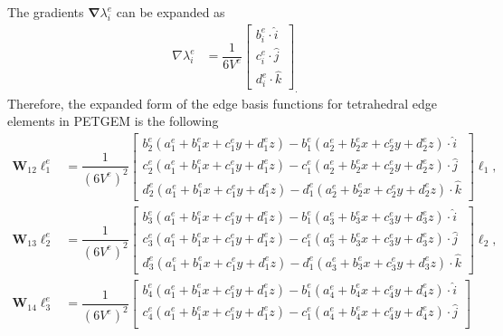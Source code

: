 \documentclass[review]{elsarticle}
\begin{document}
The gradients $\mathbf{\nabla} \lambda^{e}_{i}$ can be expanded as
\begin{align}
\nabla \lambda^{e}_{i} &= \dfrac{1}{6V^{e}} \begin{bmatrix}
b^{e}_{i} \cdot \hat{i} \\ 
c^{e}_{i} \cdot \hat{j} \\
d^{e}_{i} \cdot \hat{k} \end{bmatrix}_{.}
\end{align}
Therefore, the expanded form of the edge basis functions for tetrahedral edge elements in PETGEM  is the following
\begin{align}
\mathbf{W}_{12}\ell^{e}_{1} &= \dfrac{1}{(6V^{e})^{2}} \begin{bmatrix}
b^{e}_{2} ( a^{e}_{1} + b^{e}_{1}x + c^{e}_{1}y + d^{e}_{1}z ) - b^{e}_{1} ( a^{e}_{2} + b^{e}_{2}x + c^{e}_{2}y + d^{e}_{2}z ) \cdot \hat{i} \\
c^{e}_{2} ( a^{e}_{1} + b^{e}_{1}x + c^{e}_{1}y + d^{e}_{1}z ) - c^{e}_{1} ( a^{e}_{2} + b^{e}_{2}x + c^{e}_{2}y + d^{e}_{2}z ) \cdot \hat{j} \\
d^{e}_{2} ( a^{e}_{1} + b^{e}_{1}x + c^{e}_{1}y + d^{e}_{1}z ) - d^{e}_{1} ( a^{e}_{2} + b^{e}_{2}x + c^{e}_{2}y + d^{e}_{2}z ) \cdot \hat{k}
\end{bmatrix} \ell_{1}, \label{eq:nedelec_basis_3D7}\\
\mathbf{W}_{13}\ell^{e}_{2} &= \dfrac{1}{(6V^{e})^{2}} \begin{bmatrix}
b^{e}_{3} ( a^{e}_{1} + b^{e}_{1}x + c^{e}_{1}y + d^{e}_{1}z ) - b^{e}_{1} ( a^{e}_{3} + b^{e}_{3}x + c^{e}_{3}y + d^{e}_{3}z ) \cdot \hat{i} \\
c^{e}_{3} ( a^{e}_{1} + b^{e}_{1}x + c^{e}_{1}y + d^{e}_{1}z ) - c^{e}_{1} ( a^{e}_{3} + b^{e}_{3}x + c^{e}_{3}y + d^{e}_{3}z ) \cdot \hat{j} \\
d^{e}_{3} ( a^{e}_{1} + b^{e}_{1}x + c^{e}_{1}y + d^{e}_{1}z ) - d^{e}_{1} ( a^{e}_{3} + b^{e}_{3}x + c^{e}_{3}y + d^{e}_{3}z ) \cdot \hat{k}
\end{bmatrix} \ell_{2}, \label{eq:nedelec_basis_3D8}\\
\mathbf{W}_{14}\ell^{e}_{3} &= \dfrac{1}{(6V^{e})^{2}} \begin{bmatrix}
b^{e}_{4} ( a^{e}_{1} + b^{e}_{1}x + c^{e}_{1}y + d^{e}_{1}z ) - b^{e}_{1} ( a^{e}_{4} + b^{e}_{4}x + c^{e}_{4}y + d^{e}_{4}z ) \cdot \hat{i} \\
c^{e}_{4} ( a^{e}_{1} + b^{e}_{1}x + c^{e}_{1}y + d^{e}_{1}z ) - c^{e}_{1} ( a^{e}_{4} + b^{e}_{4}x + c^{e}_{4}y + d^{e}_{4}z ) \cdot \hat{j} \\

\end{bmatrix}
\end{align}
\end{document}
